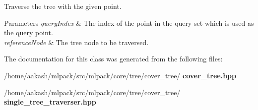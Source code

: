 Traverse the tree with the given point. 


\begin{DoxyParams}{Parameters}
{\em query\+Index} & The index of the point in the query set which is used as the query point. \\
\hline
{\em reference\+Node} & The tree node to be traversed. \\
\hline
\end{DoxyParams}


The documentation for this class was generated from the following files\+:\begin{DoxyCompactItemize}
\item 
/home/aakash/mlpack/src/mlpack/core/tree/cover\+\_\+tree/\textbf{ cover\+\_\+tree.\+hpp}\item 
/home/aakash/mlpack/src/mlpack/core/tree/cover\+\_\+tree/\textbf{ single\+\_\+tree\+\_\+traverser.\+hpp}\end{DoxyCompactItemize}
